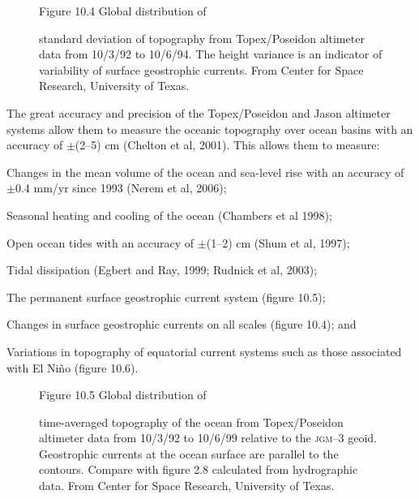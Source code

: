 \begin{figure}[t!]
\footnotesize
Figure 10.4 Global distribution of \rule{0mm}{3ex}standard deviation
of topography from Topex/Poseidon altimeter data from 10/3/92 to 10/6/94. The height
variance is an indicator of variability of surface geostrophic
currents. From Center for
Space Research, University of Texas.
\label{fig:sshvariability}
\vspace{-4ex}
\end{figure}

The great accuracy and precision of the
Topex/Poseidon and
Jason altimeter systems allow them to measure
the oceanic topography over ocean basins with an accuracy of
$\pm$(2--5) cm (Chelton et al, 2001). This allows them to measure:
\begin{enumerate}
\vitem Changes in the mean volume of the ocean and sea-level rise with
an accuracy of $\pm 0.4$ mm/yr since 1993 (Nerem et al, 2006);

\vitem Seasonal heating and cooling of the ocean (Chambers et al 1998);

\vitem Open ocean tides with an accuracy of $\pm$(1--2) cm (Shum et al, 1997);

\vitem Tidal dissipation (Egbert and Ray, 1999; Rudnick et al, 2003);

\vitem The permanent surface geostrophic current system (figure 10.5);

\vitem Changes in surface geostrophic currents on all scales (figure 10.4); and

\vitem Variations in topography of equatorial current systems such as
those associated with El Ni\~{n}o (figure 10.6).
\end{enumerate}

\begin{figure}[t!]
\footnotesize
Figure 10.5 Global distribution of \rule{0pt}{3ex} time-averaged
topography of the ocean from Topex/Pos\-eidon altimeter data from
10/3/92 to 10/6/99 relative to the \textsc{jgm}--3
geoid. Geostrophic cur\-rents at the ocean
surface are parallel to the
contours. Compare with figure 2.8 calculated from hydrographic
data. From Center for Space Research,
University of Texas.
\label{fig:sshmean}
\vspace{-4ex}
\end{figure}

